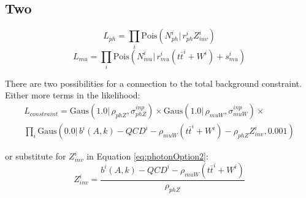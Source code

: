\subsection{Two}
\begin{equation}
\label{eq:photonOption2}
L_{ph}= \prod_i \mathrm{Pois}(N_{ph}^i |\, r_{ph}^{i} Z_{inv}^{i})
\end{equation}
\begin{equation}
L_{mu}= \prod_i \mathrm{Pois}(N_{mu}^i |\, r_{mu}^{i} (t\bar{t}^i+W^i) + s_{mu}^i)
\end{equation}

There are two possibilities for a connection to the total background constraint.  Either more terms in the likelihood:
\begin{eqnarray*}
L_{constraint}=\mathrm{Gaus}( 1.0 |\,\rho_{phZ},\sigma_{phZ}^{inp}) \times \mathrm{Gaus}( 1.0 |\,\rho_{muW},\sigma_{muW}^{inp}) \times \\
{} \prod_i \mathrm{Gaus}( 0.0 |\, b^{i}(A,k) - QCD^{i} - \rho_{muW} (t\bar{t}^i+W^i) - \rho_{phZ} Z_{inv}^{i}, 0.001)
\end{eqnarray*}

or substitute for $Z_{inv}^i$ in Equation \ref{eq:photonOption2}:
\begin{equation}
Z_{inv}^{i} = \frac{b^{i}(A,k) - QCD^{i} - \rho_{muW} (t\bar{t}^i+W^i)}{\rho_{phZ}}
\end{equation}
